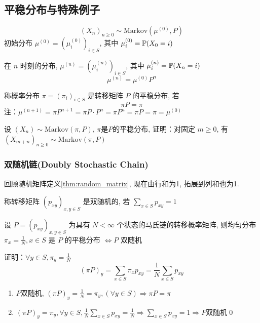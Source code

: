 \subsection{平稳分布与特殊例子}

\[
(X_n)_{n\geq 0}\sim \text{Markov}(\mu^{(0)},P)
\]
初始分布 $\mu^{(0)}=(\mu_i^{(0)})_{i\in S}$, 其中 $\mu_i^{(0)}=\mathbb{P}(X_0=i)$

在 $n$ 时刻的分布, $\mu^{(n)}=(\mu_i^{(n)})_{i\in S}$, 其中 $\mu_i^{(n)}=\mathbb{P}(X_n=i)$
\[
\mu^{(n)}=\mu^{(0)}P^n
\]
\begin{definition}[平稳分布]
    称概率分布 $\pi=(\pi_i)_{i\in S}$ 是转移矩阵 $P$ 的平稳分布, 若
    \begin{equation}
        \pi P=\pi
        \label{eq:stationary}
    \end{equation}
    注：$\mu^{(n+1)}=\pi P^{n+1}=\pi P\cdot P^n=\pi P^n=\pi P=\pi=\mu^{(0)}$
\end{definition}

\begin{problem}[作业6-4]
    设 $(X_n)\sim \text{Markov}(\pi,P)$, $\pi$是$P$的平稳分布, 证明：对固定 $m\geq 0$, 有 $(X_{m+n})_{n\geq 0}\sim \text{Markov}(\pi,P)$
\end{problem}

\subsubsection{双随机链(Doubly Stochastic Chain)}

回顾随机矩阵定义\ref{thm:random_matrix}, 现在由行和为1, 拓展到列和也为1.

\begin{definition}
    称转移矩阵 $(p_{xy})_{x,y\in S}$ 是双随机的, 若 $\sum_{x\in S}p_{xy}=1$
\end{definition}

\begin{theorem}
    设 $P=(p_{xy})_{x,y\in S}$ 为具有 $N<\infty$ 个状态的马氏链的转移概率矩阵, 则均匀分布 $\pi_x=\frac{1}{N},x\in S$ 是 $P$ 的平稳分布 $\Leftrightarrow P$ 双随机  
\end{theorem}

证明：$\forall y\in S,\pi_y=\frac{1}{N}$
\[
(\pi P)_y=\sum_{x\in S}\pi_x p_{xy}=\frac{1}{N}\sum_{x\in S}p_{xy}
\]
\begin{enumerate}
    \item $P$双随机, $(\pi P)_y=\frac{1}{N}=\pi_y,(\forall y\in S)\Rightarrow \pi P=\pi$
    \item $(\pi P)_y=\pi_y,\forall y\in S,\frac{1}{N}\sum_{x\in S}p_{xy}=\frac{1}{N}\Rightarrow \sum_{x\in S}p_{xy}=1\Rightarrow P$双随机\qed
\end{enumerate}

